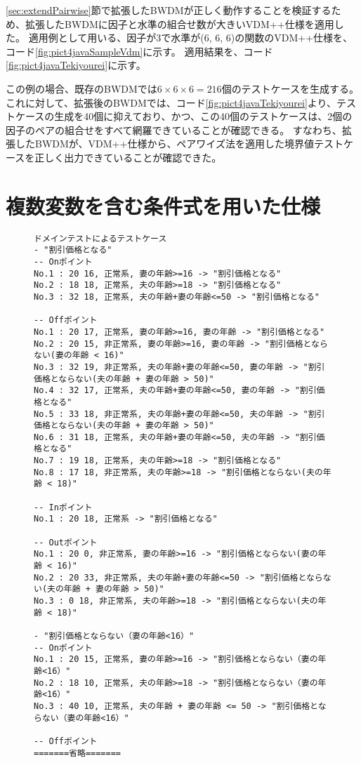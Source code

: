 \documentclass[uplatex, report, a4j, 10pt]{jsbook}
\begin{document}
\ref{sec:extendPairwise}節で拡張したBWDMが正しく動作することを検証するため、拡張したBWDMに因子と水準の組合せ数が大きいVDM++仕様を適用した。
適用例として用いる、因子が3で水準が(6, 6, 6)の関数のVDM++仕様を、コード\ref{fig:pict4javaSampleVdm}に示す。
適用結果を、コード\ref{fig:pict4javaTekiyourei}に示す。

この例の場合、既存のBWDMでは$6 \times 6 \times 6 = 216個$のテストケースを生成する。
これに対して、拡張後のBWDMでは、コード\ref{fig:pict4javaTekiyourei}より、テストケースの生成を40個に抑えており、かつ、この40個のテストケースは、2個の因子のペアの組合せをすべて網羅できていることが確認できる。
すなわち、拡張したBWDMが、VDM++仕様から、ペアワイズ法を適用した境界値テストケースを正しく出力できていることが確認できた。


\section{複数変数を含む条件式を用いた仕様}
\lstset{language=}
\begin{figure}[tp]
  \begin{lstlisting}[caption={拡張したBWDMに遊園地チケット割引機能(コード\ref{fig:vdm_park})を適用した際の出力の一部},label=fig:park_testcase]
ドメインテストによるテストケース
- "割引価格となる"
-- Onポイント
No.1 : 20 16, 正常系, 妻の年齢>=16 -> "割引価格となる"
No.2 : 18 18, 正常系, 夫の年齢>=18 -> "割引価格となる"
No.3 : 32 18, 正常系, 夫の年齢+妻の年齢<=50 -> "割引価格となる"

-- Offポイント
No.1 : 20 17, 正常系, 妻の年齢>=16, 妻の年齢 -> "割引価格となる"
No.2 : 20 15, 非正常系, 妻の年齢>=16, 妻の年齢 -> "割引価格とならない(妻の年齢 < 16)"
No.3 : 32 19, 非正常系, 夫の年齢+妻の年齢<=50, 妻の年齢 -> "割引価格とならない(夫の年齢 + 妻の年齢 > 50)"
No.4 : 32 17, 正常系, 夫の年齢+妻の年齢<=50, 妻の年齢 -> "割引価格となる"
No.5 : 33 18, 非正常系, 夫の年齢+妻の年齢<=50, 夫の年齢 -> "割引価格とならない(夫の年齢 + 妻の年齢 > 50)"
No.6 : 31 18, 正常系, 夫の年齢+妻の年齢<=50, 夫の年齢 -> "割引価格となる"
No.7 : 19 18, 正常系, 夫の年齢>=18 -> "割引価格となる"
No.8 : 17 18, 非正常系, 夫の年齢>=18 -> "割引価格とならない(夫の年齢 < 18)"

-- Inポイント
No.1 : 20 18, 正常系 -> "割引価格となる"

-- Outポイント
No.1 : 20 0, 非正常系, 妻の年齢>=16 -> "割引価格とならない(妻の年齢 < 16)"
No.2 : 20 33, 非正常系, 夫の年齢+妻の年齢<=50 -> "割引価格とならない(夫の年齢 + 妻の年齢 > 50)"
No.3 : 0 18, 非正常系, 夫の年齢>=18 -> "割引価格とならない(夫の年齢 < 18)"

- "割引価格とならない（妻の年齢<16）"
-- Onポイント
No.1 : 20 15, 正常系, 妻の年齢>=16 -> "割引価格とならない（妻の年齢<16）"
No.2 : 18 10, 正常系, 夫の年齢>=18 -> "割引価格とならない（妻の年齢<16）"
No.3 : 40 10, 正常系, 夫の年齢 + 妻の年齢 <= 50 -> "割引価格とならない（妻の年齢<16）"

-- Offポイント
=======省略=======
\end{lstlisting}
\end{figure}
\end{document}
